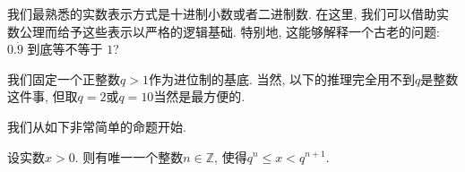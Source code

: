 

我们最熟悉的实数表示方式是十进制小数或者二进制数. 在这里, 我们可以借助实数公理而给予这些表示以严格的逻辑基础. 特别地, 这能够解释一个古老的问题: $0.\dot{9}$ 到底等不等于 $1$?

我们固定一个正整数$q>1$作为进位制的基底. 当然, 以下的推理完全用不到$q$是整数这件事, 但取$q=2$或$q=10$当然是最方便的.

我们从如下非常简单的命题开始.
\begin{lemma}{}
设实数$x>0$. 则有唯一一个整数$n\in\mathbb{Z}$, 使得$q^n\leq x<q^{n+1}$.
\end{lemma}